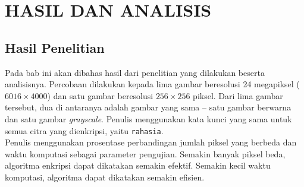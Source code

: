 \chapter{HASIL DAN ANALISIS}

%
\vspace{12pt}

\section{Hasil Penelitian}
Pada bab ini akan dibahas hasil dari penelitian yang dilakukan beserta analisisnya. 
Percobaan dilakukan kepada lima gambar beresolusi 24 megapiksel ($6016\times 4000$) dan
satu gambar beresolusi $256\times 256$ piksel. Dari lima gambar tersebut, dua di 
antaranya adalah gambar yang sama -- satu gambar berwarna dan satu gambar \textit{grayscale}.
Penulis menggunakan kata kunci yang sama untuk semua citra yang dienkripsi, yaitu \label{kunci}\texttt{rahasia}.\\
Penulis menggunakan prosentase perbandingan jumlah piksel yang berbeda dan 
waktu komputasi sebagai parameter pengujian. Semakin banyak piksel beda, algoritma enkripsi
dapat dikatakan semakin efektif. Semakin kecil waktu komputasi, algoritma dapat dikatakan semakin efisien.
